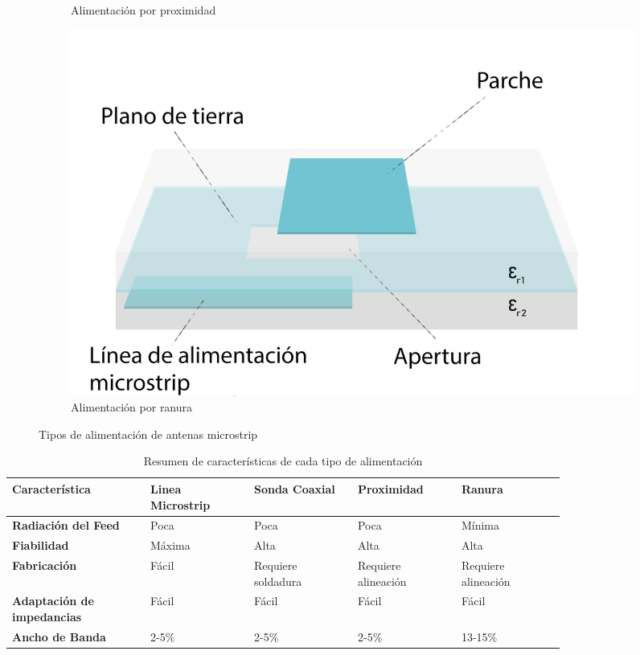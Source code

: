 \begin{figure}[h]
\begin{subfigure}[b]{0.4\textwidth}
         \caption{Alimentación por proximidad}
         \label{fig:proximidad}
     \end{subfigure}
     \hfill
     \begin{subfigure}[b]{0.4\textwidth}
         \centering
         \includegraphics[width=\textwidth]{archivos/parche/apertura}
         \caption{Alimentación por ranura}
         \label{fig:ranura}
     \end{subfigure}
        \caption{Tipos de alimentación de antenas microstrip}
        \label{fig:sistemas}
\end{figure}

\begin{table}[H]
   
   \label{tab:example}
   \small %
   \centering %
   \begin{tabular}{m{0.2\linewidth}m{0.15\linewidth}m{0.15\linewidth}m{0.15\linewidth}m{0.15\linewidth}} %
   \toprule[\heavyrulewidth]\toprule[\heavyrulewidth]
   \textbf{Característica} & \textbf{Linea Microstrip} & \textbf{Sonda Coaxial} & \textbf{Proximidad} & \textbf{Ranura} \\ 
   \midrule
   \textbf{Radiación del Feed} & Poca & Poca & Poca & Mínima \\
   \textbf{Fiabilidad} & Máxima & Alta & Alta & Alta \\
   \textbf{Fabricación} & Fácil & Requiere soldadura & Requiere alineación & Requiere alineación \\
   \textbf{Adaptación de impedancias} & Fácil & Fácil & Fácil & Fácil \\
   \textbf{Ancho de Banda} & 2-5\% & 2-5\% & 2-5\% & 13-15\% \\
   
   \bottomrule[\heavyrulewidth] 
   \end{tabular}
   \caption{Resumen de características de cada tipo de alimentación} 
\end{table}



